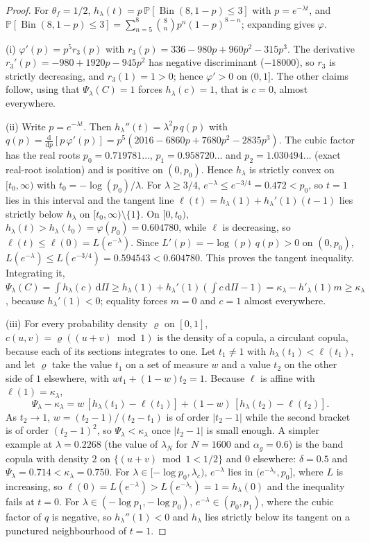 \documentclass[11pt,a4paper]{article}
\theoremstyle{definition}
\theoremstyle{remark}
\newcommand{\Prob}{\mathbb{P}}
\newcommand{\Bin}{\operatorname{Bin}}
\begin{document}
\begin{proof}
For $\theta_f=1/2$, $h_\lambda(t)=p\,\Prob[\Bin(8,1-p)\le3]$ with $p=e^{-\lambda t}$, and $\Prob[\Bin(8,1-p)\le3]=\sum_{n=5}^{8}\binom8n p^n(1-p)^{8-n}$; expanding gives $\varphi$.

(i) $\varphi'(p)=p^5r_3(p)$ with $r_3(p)=336-980p+960p^2-315p^3$. The derivative $r_3'(p)=-980+1920p-945p^2$ has negative discriminant ($-18000$), so $r_3$ is strictly decreasing, and $r_3(1)=1>0$; hence $\varphi'>0$ on $(0,1]$. The other claims follow, using that $\Psi_\lambda(C)=1$ forces $h_\lambda(c)=1$, that is $c=0$, almost everywhere.

(ii) Write $p=e^{-\lambda t}$. Then $h_\lambda''(t)=\lambda^2p\,q(p)$ with $q(p)=\frac{\mathrm d}{\mathrm dp}[p\,\varphi'(p)]=p^5(2016-6860p+7680p^2-2835p^3)$. The cubic factor has the real roots $p_0=0.719781\ldots$, $p_1=0.958720\ldots$ and $p_2=1.030494\ldots$ (exact real-root isolation) and is positive on $(0,p_0)$. Hence $h_\lambda$ is strictly convex on $[t_0,\infty)$ with $t_0=-\log(p_0)/\lambda$. For $\lambda\ge3/4$, $e^{-\lambda}\le e^{-3/4}=0.472<p_0$, so $t=1$ lies in this interval and the tangent line $\ell(t)=h_\lambda(1)+h_\lambda'(1)(t-1)$ lies strictly below $h_\lambda$ on $[t_0,\infty)\setminus\{1\}$. On $[0,t_0)$, $h_\lambda(t)>h_\lambda(t_0)=\varphi(p_0)=0.604780$, while $\ell$ is decreasing, so $\ell(t)\le\ell(0)=L(e^{-\lambda})$. Since $L'(p)=-\log(p)\,q(p)>0$ on $(0,p_0)$, $L(e^{-\lambda})\le L(e^{-3/4})=0.594543<0.604780$. This proves the tangent inequality. Integrating it, $\Psi_\lambda(C)=\int h_\lambda(c)\,\mathrm{d}\Pi\ge h_\lambda(1)+h_\lambda'(1)(\int c\,\mathrm{d}\Pi-1)=\kappa_\lambda-h'_\lambda(1)m\ge\kappa_\lambda$, because $h_\lambda'(1)<0$; equality forces $m=0$ and $c=1$ almost everywhere.

(iii) For every probability density $\varrho$ on $[0,1]$, $c(u,v)=\varrho((u+v)\bmod1)$ is the density of a copula, a circulant copula, because each of its sections integrates to one. Let $t_1\neq1$ with $h_\lambda(t_1)<\ell(t_1)$, and let $\varrho$ take the value $t_1$ on a set of measure $w$ and a value $t_2$ on the other side of $1$ elsewhere, with $wt_1+(1-w)t_2=1$. Because $\ell$ is affine with $\ell(1)=\kappa_\lambda$,
\[
\Psi_\lambda-\kappa_\lambda=w\,[h_\lambda(t_1)-\ell(t_1)]+(1-w)\,[h_\lambda(t_2)-\ell(t_2)].
\]
As $t_2\to1$, $w=(t_2-1)/(t_2-t_1)$ is of order $|t_2-1|$ while the second bracket is of order $(t_2-1)^2$, so $\Psi_\lambda<\kappa_\lambda$ once $|t_2-1|$ is small enough. A simpler example at $\lambda=0.2268$ (the value of $\lambda_N$ for $N=1600$ and $\alpha_g=0.6$) is the band copula with density $2$ on $\{(u+v)\bmod1<1/2\}$ and $0$ elsewhere: $\delta=0.5$ and $\Psi_\lambda=0.714<\kappa_\lambda=0.750$. For $\lambda\in[-\log p_0,\lambda_c)$, $e^{-\lambda}$ lies in $(e^{-\lambda_c},p_0]$, where $L$ is increasing, so $\ell(0)=L(e^{-\lambda})>L(e^{-\lambda_c})=1=h_\lambda(0)$ and the inequality fails at $t=0$. For $\lambda\in(-\log p_1,-\log p_0)$, $e^{-\lambda}\in(p_0,p_1)$, where the cubic factor of $q$ is negative, so $h_\lambda''(1)<0$ and $h_\lambda$ lies strictly below its tangent on a punctured neighbourhood of $t=1$.


\end{proof}
\end{document}
